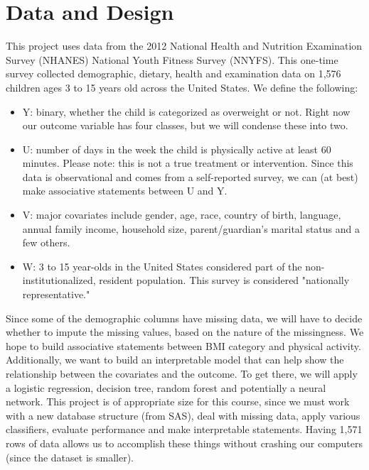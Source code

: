 \documentclass[twoside,11pt]{article}
\begin{document}
\section{Data and Design}
This project uses data from the 2012 National Health and Nutrition Examination Survey (NHANES) National Youth Fitness Survey (NNYFS). This one-time survey collected demographic, dietary, health and examination data on 1,576 children ages 3 to 15 years old across the United States. We define the following:
\begin{itemize}[noitemsep,topsep=0pt]
\item Y: binary, whether the child is categorized as overweight or not. Right now our outcome variable has four classes, but we will condense these into two.
\item U: number of days in the week the child is physically active at least 60 minutes. Please note: this is not a true treatment or intervention. Since this data is observational and comes from a self-reported survey, we can (at best) make associative statements between U and Y. 
\item V: major covariates include gender, age, race, country of birth, language, annual family income, household size, parent/guardian's marital status and a few others. 
\item W: 3 to 15 year-olds in the United States considered part of the non-institutionalized, resident population. This survey is considered "nationally representative."
\end{itemize}
Since some of the demographic columns have missing data, we will have to decide whether to impute the missing values, based on the nature of the missingness. We hope to build associative statements between BMI category and physical activity. Additionally, we want to build an interpretable model that can help show the relationship between the covariates and the outcome. To get there, we will apply a logistic regression, decision tree, random forest and potentially a neural network. This project is of appropriate size for this course, since we must work with a new database structure (from SAS), deal with missing data, apply various classifiers, evaluate performance and make interpretable statements. Having 1,571 rows of data allows us to accomplish these things without crashing our computers (since the dataset is smaller).
\end{document}
